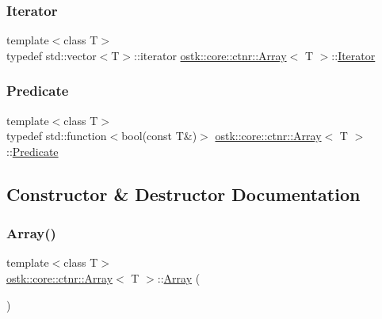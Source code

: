 \mbox{\label{classostk_1_1core_1_1ctnr_1_1_array_accf81dc56e553dad2ce7b72802836c46}} 
\subsubsection{\texorpdfstring{Iterator}{Iterator}}
{\footnotesize\ttfamily template$<$class T$>$ \\
typedef std\+::vector$<$T$>$\+::iterator \hyperlink{classostk_1_1core_1_1ctnr_1_1_array}{ostk\+::core\+::ctnr\+::\+Array}$<$ T $>$\+::\hyperlink{classostk_1_1core_1_1ctnr_1_1_array_accf81dc56e553dad2ce7b72802836c46}{Iterator}}

\mbox{\label{classostk_1_1core_1_1ctnr_1_1_array_a7c04a98dd10cd625acf96addd312d0af}} 
\subsubsection{\texorpdfstring{Predicate}{Predicate}}
{\footnotesize\ttfamily template$<$class T$>$ \\
typedef std\+::function$<$bool(const T\&)$>$ \hyperlink{classostk_1_1core_1_1ctnr_1_1_array}{ostk\+::core\+::ctnr\+::\+Array}$<$ T $>$\+::\hyperlink{classostk_1_1core_1_1ctnr_1_1_array_a7c04a98dd10cd625acf96addd312d0af}{Predicate}}



\subsection{Constructor \& Destructor Documentation}
\mbox{\label{classostk_1_1core_1_1ctnr_1_1_array_a4e10a5235b2fa8d420dc7fd30ebb081d}} 
\subsubsection{\texorpdfstring{Array()}{Array()}\hspace{0.1cm}{\footnotesize\ttfamily [1/8]}}
{\footnotesize\ttfamily template$<$class T$>$ \\
\hyperlink{classostk_1_1core_1_1ctnr_1_1_array}{ostk\+::core\+::ctnr\+::\+Array}$<$ T $>$\+::\hyperlink{classostk_1_1core_1_1ctnr_1_1_array}{Array} (\begin{DoxyParamCaption}{ }\end{DoxyParamCaption})}



